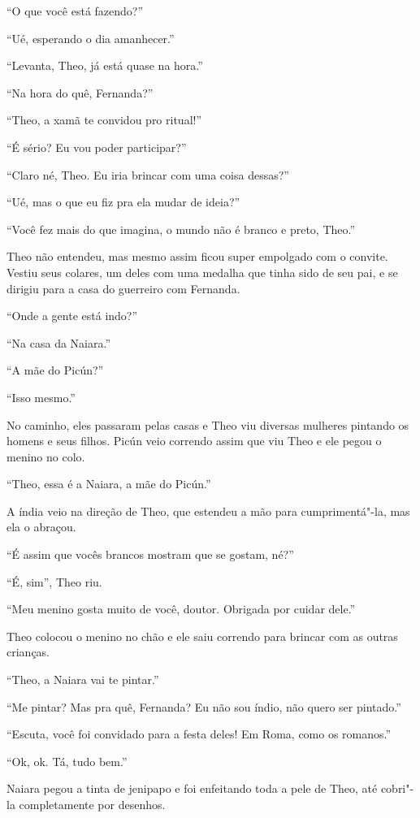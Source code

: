 ``O que você está fazendo?''

``Ué, esperando o dia amanhecer.''

``Levanta, Theo, já está quase na hora.''

``Na hora do quê, Fernanda?''

``Theo, a xamã te convidou pro ritual!''

``É sério? Eu vou poder participar?''

``Claro né, Theo. Eu iria brincar com uma coisa dessas?''

``Ué, mas o que eu fiz pra ela mudar de ideia?''

``Você fez mais do que imagina, o mundo não é branco e preto, Theo.''

Theo não entendeu, mas mesmo assim ficou super empolgado com o convite.
Vestiu seus colares, um deles com uma medalha que tinha sido de seu pai,
e se dirigiu para a casa do guerreiro com Fernanda.

``Onde a gente está indo?''

``Na casa da Naiara.''

``A mãe do Picún?''

``Isso mesmo.''

No caminho, eles passaram pelas casas e Theo viu diversas mulheres
pintando os homens e seus filhos. Picún veio correndo assim que viu Theo
e ele pegou o menino no colo.

``Theo, essa é a Naiara, a mãe do Picún.''

A índia veio na direção de Theo, que estendeu a mão para cumprimentá"-la,
mas ela o abraçou.

``É assim que vocês brancos mostram que se gostam, né?''

``É, sim'', Theo riu.

``Meu menino gosta muito de você, doutor. Obrigada por cuidar dele.''

Theo colocou o menino no chão e ele saiu correndo para brincar com as
outras crianças.

``Theo, a Naiara vai te pintar.''

``Me pintar? Mas pra quê, Fernanda? Eu não sou índio, não quero ser
pintado.''

``Escuta, você foi convidado para a festa deles! Em Roma, como os
romanos.''

``Ok, ok. Tá, tudo bem.''

Naiara pegou a tinta de jenipapo e foi enfeitando toda a pele de Theo,
até cobri"-la completamente por desenhos.

